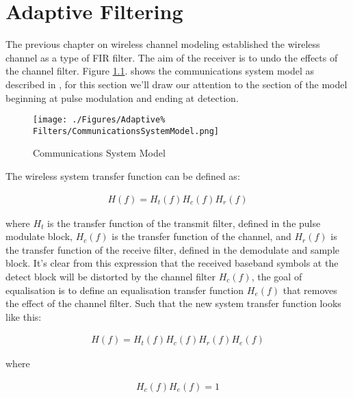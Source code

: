 \chapter{Adaptive Filtering}

The previous chapter on wireless channel modeling established %
the wireless channel as a type of FIR filter. The aim of the %
receiver is to undo the effects of the channel filter. %
Figure \ref{fig:CommSysModel}. shows the communications %
system model as described in \cite{Sklar01}, for this section %
we'll draw our attention to the section of the model beginning %
at pulse modulation and ending at detection. 

\begin{figure}[h!]
	\texttt{[image: ./Figures/Adaptive\%
		Filters/CommunicationsSystemModel.png]}
	\caption{Communications System Model \cite{Sklar01}}
	\label{fig:CommSysModel}
\end{figure}

The wireless system transfer function can be defined as:

\begin{align}
	H(f) = H_{t}(f)H_{c}(f)H_{r}(f)
\end{align}

where $H_{t}$ is the transfer function of the transmit filter, 
defined in the pulse modulate block, %
$H_{c}(f)$ is the transfer function of the channel, and $H_{r}%
(f)$ is the transfer function of the receive filter, defined in %
the demodulate and sample block. It's clear from this %
expression that the received baseband symbols at the %
detect block will be distorted by the channel filter $H_{c}%
(f)$, the goal of equalisation is to define an equalisation %
transfer function $H_{e}(f)$ that removes the effect of %
the channel filter. Such that the new system transfer %
function looks like this:

\begin{align}
	H(f) = H_{t}(f)H_{c}(f)H_{r}(f)H_{e}(f)
\end{align}

where

\begin{align}
	H_{c}(f)H_{e}(f) = 1
\end{align}





